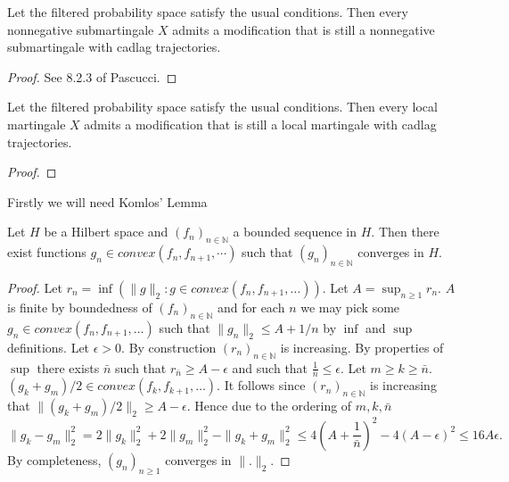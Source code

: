 \begin{lemma}\label{lem:exists_cadlag_mod_of_nonneg_submg}
  Let the filtered probability space satisfy the usual conditions.
  Then every nonnegative submartingale $X$ admits a modification that is still a nonnegative submartingale with cadlag trajectories.
\end{lemma}
\begin{proof}
  See 8.2.3 of Pascucci.
\end{proof}

\begin{lemma}\label{lem:exists_cadlag_mod_of_local_mg}
  Let the filtered probability space satisfy the usual conditions.
  Then every local martingale $X$ admits a modification that is still a local martingale with cadlag trajectories.
\end{lemma}
\begin{proof}
\end{proof}

Firstly we will need Komlos' Lemma

\begin{lemma}\label{lem:komlos_aux}
  Let $H$ be a Hilbert space and $(f_n)_{n\in\mathbb{N}}$ a bounded sequence in $H$. Then there exist functions $g_n\in convex(f_n,f_{n+1},\cdots)$ such that $(g_n)_{n\in\mathbb{N}}$ converges in $H$.
\end{lemma}
\begin{proof}
  Let $r_n = \inf(\|g\|_2:g\in convex(f_n, f_{n+1},\ldots))$.
  Let $A=\sup_{n\geq1} r_n$. $A$ is finite by boundedness of $(f_n)_{n\in\mathbb{N}}$ and
  for each $n$ we  may pick some $g_n\in convex(f_n, f_{n+1},\ldots)$ such that $ \|g_n\|_2\leq A+1/n$ by $\inf$ and $\sup$ definitions.
  Let $\epsilon>0$.
  By construction $(r_n)_{n\in\mathbb{N}}$ is increasing. By properties of $\sup$ there exists $\bar{n}$ such that $r_{\bar{n}}\geq A-\epsilon$ and such that $\frac{1}{\bar{n}}\leq\epsilon$.
  Let $m\geq k\geq \bar{n}$. $(g_k+g_m)/2 \in convex(f_k,f_{k+1},\ldots)$. It follows since $(r_n)_{n\in\mathbb{N}}$ is increasing that
  $\|(g_k+g_m)/2\|_2\geq A-\epsilon$.
  Hence due to the ordering of $m,k,\bar{n}$
  $$ \|g_k-g_m\|_2^2=2 \|g_k\|_2^2+2\|g_m\|_2^2- \|g_k+g_m\|_2^2
  \leq 4(A+\frac{1}{\bar{n}})^2-4(A-\epsilon)^2\leq 16A\epsilon.$$ By completeness, $(g_n)_{n\geq1}$  converges in $\|.\|_2$.
\end{proof}

